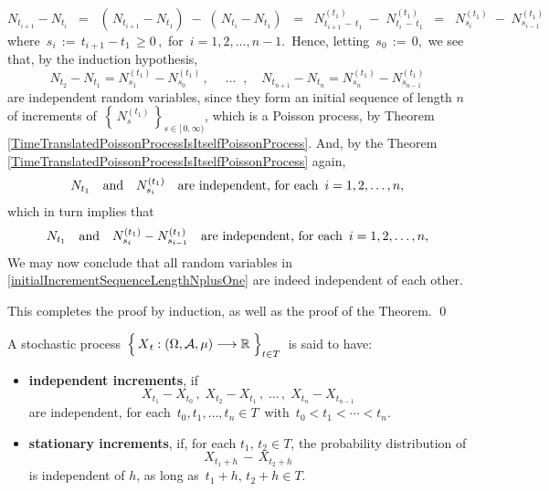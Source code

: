\begin{equation*}
N_{t_{i+1}} - N_{t_{i}}
\;\; = \;\;
	\left(\,N_{t_{i+1}}-N_{t_{1}}\right) \;-\; \left(\,N_{t_{i}} - N_{t_{1}}\right)
\;\; = \;\;
	N^{(t_{1})}_{t_{i+1}\,-\,t_{1}}
	\;-\;
	N^{(t_{1})}_{t_{i}\,-\,t_{1}}
\;\; = \;\;
	N^{(t_{1})}_{s_{i}}
	\;-\;
	N^{(t_{1})}_{s_{i-1}}
\end{equation*}
where \,$s_{i} \,:=\, t_{i+1} - t_{1} \,\geq 0\,$,\,
for \,$i = 1, 2, \ldots, n-1$.\,
Hence, letting \,$s_{0} \,:=\, 0$,\, we see that, by the induction hypothesis,
\begin{equation*}
N_{t_{2}} - N_{t_{1}} = N^{(t_{1})}_{s_{1}} - N^{(t_{1})}_{s_{0}}\,,\;
\quad\ldots\;\;,\quad
N_{t_{n+1}} - N_{t_{n}} = N^{(t_{1})}_{s_{n}} - N^{(t_{1})}_{s_{n-1}}
\end{equation*}
are independent random variables, since they form
an initial sequence of length $n$ of increments of
\,$\left\{\,N^{(t_{1})}_{s}\,\right\}_{s\in[\,0,\infty)}$,
which is a Poisson process,
by Theorem \ref{TimeTranslatedPoissonProcessIsItselfPoissonProcess}.
And, by the Theorem \ref{TimeTranslatedPoissonProcessIsItselfPoissonProcess} again,
\begin{equation*}
N_{t_{1}}
\quad\textnormal{and}\quad
N^{(t_{1})}_{s_{i}}
\quad
\textnormal{are independent, for each \,$i = 1,2,\ldots, n$},
\end{equation*}
which in turn implies that
\begin{equation*}
N_{t_{1}}
\quad\textnormal{and}\quad
N^{(t_{1})}_{s_{i}} - N^{(t_{1})}_{s_{i-1}}
\quad
\textnormal{are independent, for each \,$i = 1,2,\ldots, n$},
\end{equation*}
We may now conclude that all random variables in
\eqref{initialIncrementSequenceLengthNplusOne}
are indeed independent of each other.

\vskip 0.3cm
\noindent
This completes the proof by induction, as well as the proof of the Theorem.
\qed


\vskip 1.0cm
\begin{definition}
\mbox{}
\vskip 0.1cm
\noindent
A stochastic process
\,$\left\{\,\overset{{\color{white}.}}{X}_{t} : (\Omega,\mathcal{A},\mu) \longrightarrow \Re \;\right\}_{t \in T}$\,
is said to have:
\begin{itemize}
\item
	\textbf{independent increments}, if
	\begin{equation*}
	X_{t_{1}} - X_{t_{0}}\,,\;
	X_{t_{2}} - X_{t_{1}}\,,\;
	\ldots\,,\;
	X_{t_{n}} - X_{t_{n-1}}
	\end{equation*}
	are independent, for each \,$t_{0}, t_{1}, \ldots, t_{n} \in T$\,
	with \,$t_{0} < t_{1} < \cdots < t_{n}$.
\item
	\textbf{stationary increments}, if,
	for each $t_{1},\, t_{2} \in T$, the probability distribution of
	\begin{equation*}
	X_{t_{1}+h} \,-\, X_{t_{2}+h}
	\end{equation*}
	is independent of $h$, as long as \,$t_{1} + h,\, t_{2} + h \in T$.
\end{itemize}
\end{definition}

